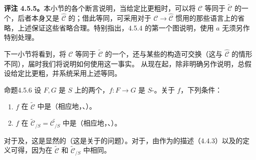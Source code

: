 \textbf{评注 4.5.5。}本小节的各个断言说明，当给定比更粗时，可以将 $\mathcal C$ 等同于 $\widetilde{\mathcal C}$ 的一个，后者本身又是 $\widehat{\mathcal C}$ 的；借此等同，可采用对于 $\mathcal C\to\widehat{\mathcal C}$ 惯用的那些语言上的省略，上述保证这些省略合理。特别指出，4.5.4 的第一个图说明，使用 $a$ 无须另作特别处理。

下一小节将看到，将 $\mathcal C$ 等同于 $\widetilde{\mathcal C}$ 的一个，还与某些的构造可交换（这与 $\widehat{\mathcal C}$ 的情形不同），届时我们将说明如何使用这一事实。
从现在起，除非明确另作说明，总假设给定比更粗，并系统采用上述等同。
\begin{SGAresult}{命题}{4.5.6}
设 $F,G$ 是 $S$ 上的两个，$f:F\to G$ 是 $S$-。关于 $f$，下列条件：
\begin{enumerate}
\item[(i)] $f$ 在 $\widetilde{\mathcal C}$ 中是（相应地，、）。
\item[(ii)] $f$ 在 $\widetilde{\mathcal C}_{/S}=\widetilde{\mathcal C_{/S}}$ 中是（相应地，、）。
\end{enumerate}
\end{SGAresult}
对于及，这是显然的（这是关于的问题）。对于，由作为的描述（4.4.3）以及的定义可得，因为在 $\widetilde{\mathcal C}$ 和 $\widetilde{\mathcal C}_{/S}$ 中相同。
